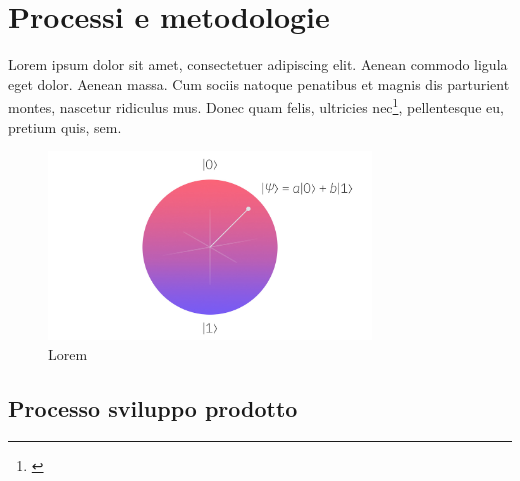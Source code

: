 \chapter{Processi e metodologie}
\label{chap:processi-metodologie}

Lorem ipsum dolor sit amet, consectetuer adipiscing elit. Aenean commodo ligula eget dolor. Aenean massa. Cum sociis natoque penatibus et magnis dis parturient montes, nascetur ridiculus mus. Donec quam felis, ultricies nec\footnote{\cite{article:spooky}}, pellentesque eu, pretium quis, sem.

\begin{figure}[h]
    \centering
    \includegraphics[height=5cm]{img/qubit.jpeg}
    \caption{Lorem}
    \label{fig:qubit}
\end{figure}
\lipsum[1]

\section{Processo sviluppo prodotto}
\lipsum[1-2]

\newpage